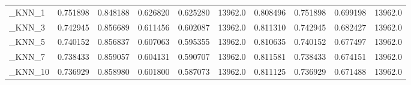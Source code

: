 \begin{tabular}{lrrrrrrrrr}
\_KNN\_1                                             &  0.751898 &         0.848188 &      0.626820 &        0.625280 &        13962.0 &            0.808496 &         0.751898 &           0.699198 &           13962.0 \\
\_KNN\_3                                             &  0.742945 &         0.856689 &      0.611456 &        0.602087 &        13962.0 &            0.811310 &         0.742945 &           0.682427 &           13962.0 \\
\_KNN\_5                                             &  0.740152 &         0.856837 &      0.607063 &        0.595355 &        13962.0 &            0.810635 &         0.740152 &           0.677497 &           13962.0 \\
\_KNN\_7                                             &  0.738433 &         0.859057 &      0.604131 &        0.590707 &        13962.0 &            0.811581 &         0.738433 &           0.674151 &           13962.0 \\
\_KNN\_10                                            &  0.736929 &         0.858980 &      0.601800 &        0.587073 &        13962.0 &            0.811125 &         0.736929 &           0.671488 &           13962.0 \\
\bottomrule
\end{tabular}
